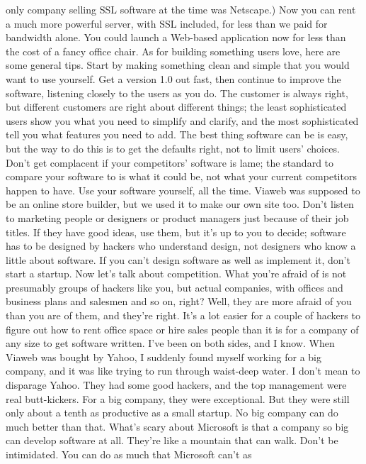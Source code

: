 only company selling SSL software at the time was Netscape.)  Now
you can rent a much more powerful server, with SSL included, for
less than we paid for bandwidth alone.  You could launch a Web-based
application now for less than the cost of a fancy office chair.
As for building something users love, here are some general tips.
Start by making something clean and simple that you would want to
use yourself.  Get a version 1.0 out fast, then continue to improve
the software, listening closely to the users as you do.  The customer
is always right, but different customers are right about different
things; the least sophisticated users show you what you need to
simplify and clarify, and the most sophisticated tell you what
features you need to add. The best thing software can be is easy,
but the way to do this is to get the defaults right, not to limit
users' choices.  Don't get complacent if your competitors' software
is lame; the standard to compare your software to is what it could
be, not what your current competitors happen to have.  Use your
software yourself, all the time.  Viaweb was supposed to be an
online store builder, but we used it to make our own site too.
Don't listen to marketing people or designers or product managers
just because of their job titles.  If they have good ideas, use
them, but it's up to you to decide; software has to be designed by
hackers who understand design, not designers who know a little
about software.  If you can't design software as well as implement
it, don't start a startup.
Now let's talk about competition.  What you're afraid of is not
presumably groups of hackers like you, but actual companies, with
offices and business plans and salesmen and so on, right?  Well,
they are more afraid of you than you are of them, and they're right.
It's a lot easier for a couple of hackers to figure out how to rent
office space or hire sales people than it is for a company of any
size to get software written.  I've been on both sides, and I know.
When Viaweb was bought by Yahoo, I suddenly found myself working
for a big company, and it was like trying to run through waist-deep
water.
I don't mean to disparage Yahoo.  They had some good hackers, and
the top management were real butt-kickers.  For a big company, they
were exceptional.  But they were still only about a tenth as
productive as a small startup.  No big company can do much better
than that.  What's scary about Microsoft is that a company so
big can develop software at all.  They're like a mountain that
can walk.
Don't be intimidated.  You can do as much that Microsoft can't as
